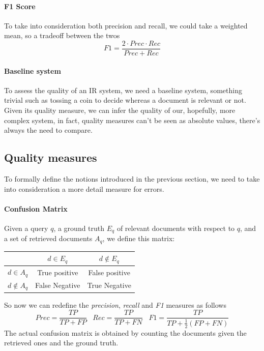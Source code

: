 \paragraph{F1 Score}
To take into consideration both precision and recall, we could take 
a weighted mean, so a tradeoff between the twos 
$$\mathit{F1} = \frac{2\cdot\mathit{Prec}\cdot\mathit{Rec}}
{\mathit{Prec} + \mathit{Rec}}$$

\paragraph{Baseline system}
To assess the quality of an IR system, we need a baseline system, 
something trivial such as tossing a coin to decide whereas a document 
is relevant or not. 
Given its quality measure, we can infer the quality of our, hopefully, 
more complex system, in fact, quality measures can't be seen as absolute 
values, there's always the need to compare.

\subsection{Quality measures}
To formally define the notions introduced in the previous section, we need
to take into consideration a more detail measure for errors.

\paragraph{Confusion Matrix}
Given a query $q$, a ground truth $E_q$ of relevant documents with respect 
to $q$, and a set of retrieved documents $A_q$, we define this matrix:
\begin{center}
    \begin{tabular}{c | c |c}
            & $d \in E_q$ & $d \notin E_q$\\
            \hline
            $d \in A_q$ & True positive & False positive\\
            \hline
            $d \notin A_q$ & False Negative & True Negative\\
    \end{tabular}
\end{center}
So now we can redefine the \emph{precision}, \emph{recall} and \emph{F1} 
measures as follows
$$\mathit{Prec} = \frac{\mathit{TP}}{\mathit{TP} + \mathit{FP}}\;\;\;
\mathit{Rec} = \frac{\mathit{TP}}{\mathit{TP} + \mathit{FN}}\;\;\;
\mathit{F1} = \frac{\mathit{TP}}{\mathit{TP} + \frac{1}{2}(\mathit{FP} + \mathit{FN})}$$
The actual confusion matrix is obtained by counting the documents given the retrieved 
ones and the ground truth. 

